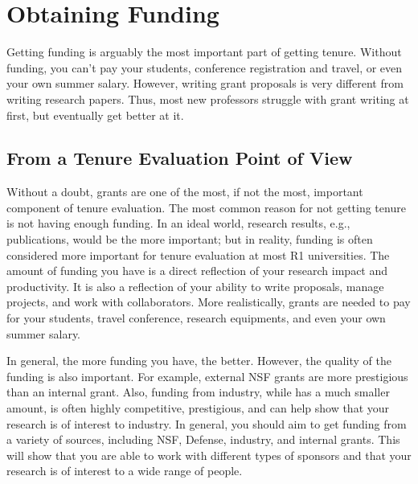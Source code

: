\documentclass[oneside,11pt,dvipsnames]{book}
\begin{document}




\chapter{Obtaining Funding}
Getting funding is arguably the most important part of getting tenure.  Without funding, you can't pay your students, conference registration and travel, or even your own summer salary. However, writing grant proposals is very different from writing research papers. Thus, most new professors struggle with grant writing at first, but eventually get better at it.





\section{From a Tenure Evaluation Point of View}
Without a doubt, grants are one of the most, if not the most, important component of tenure evaluation.  The most common reason for not getting tenure is not having enough funding. In an ideal world, research results, e.g., publications, would be the more important; but in reality, funding is often considered more important for tenure evaluation at most R1 universities.
The amount of funding you have is a direct reflection of your research impact and productivity.  It is also a reflection of your ability to write proposals, manage projects, and work with collaborators. More realistically, grants are needed to pay for your students, travel conference, research equipments, and even your own summer salary.

In general, the more funding you have, the better.  However, the quality of the funding is also important.  For example, external NSF grants are more prestigious than an internal grant.  Also, funding from industry, while has a much smaller amount, is often highly competitive, prestigious, and can help show that your research is of interest to industry.  In general, you should aim to get funding from a variety of sources, including NSF, Defense, industry, and internal grants.  This will show that you are able to work with different types of sponsors and that your research is of interest to a wide range of people.
\end{document}
